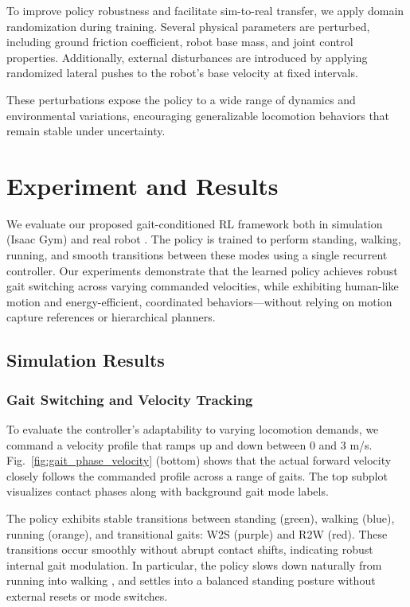 \documentclass[letterpaper, 10 pt, conference]{ieeeconf}
\begin{document}
To improve policy robustness and facilitate sim-to-real transfer, we apply domain randomization during training. Several physical parameters are perturbed, including ground friction coefficient, robot base mass, and joint control properties. Additionally, external disturbances are introduced by applying randomized lateral pushes to the robot's base velocity at fixed intervals. 

These perturbations expose the policy to a wide range of dynamics and environmental variations, encouraging generalizable locomotion behaviors that remain stable under uncertainty.








\section{Experiment and Results}

We evaluate our proposed gait-conditioned RL framework both in simulation (Isaac Gym) and real robot . The policy is trained to perform standing, walking, running, and smooth transitions between these modes using a single recurrent controller. Our experiments demonstrate that the learned policy achieves robust gait switching across varying commanded velocities, while exhibiting human-like motion and energy-efficient, coordinated behaviors—without relying on motion capture references or hierarchical planners.



\subsection{Simulation Results}

\subsubsection{Gait Switching and Velocity Tracking}

To evaluate the controller's adaptability to varying locomotion demands, we command a velocity profile that ramps up and down between $0$ and $3$ m/s. Fig.~\ref{fig:gait_phase_velocity} (bottom) shows that the actual forward velocity closely follows the commanded profile across a range of gaits. The top subplot visualizes contact phases along with background gait mode labels.

The policy exhibits stable transitions between standing (green), walking (blue), running (orange), and transitional gaits: W2S (purple) and R2W (red). These transitions occur smoothly without abrupt contact shifts, indicating robust internal gait modulation. In particular, the policy slows down naturally from running into walking , and settles into a balanced standing posture without external resets or mode switches.
\end{document}
